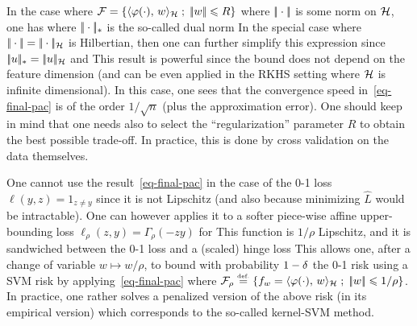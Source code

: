 \begin{exmp}
	In the case where $\mathcal{F} = \left\{  \langle \varphi(\cdot),\,w\rangle_{\mathcal{H}}  \;;\;  |\!| w |\!| \leqslant R \right\}$
	where $|\!| \cdot |\!|$ is some norm on $\mathcal{H}$, one has
	where $|\!| \cdot |\!|_*$ is the so-called dual norm
	In the special case where $|\!| \cdot |\!|=|\!| \cdot |\!|_{\mathcal{H}}$ is Hilbertian, then one can further simplify this expression since
	$|\!| u |\!|_* = |\!| u |\!|_{\mathcal{H}}$ and
	This result is powerful since the bound does not depend on the feature dimension (and can be even applied in the RKHS setting where $\mathcal{H}$ is infinite dimensional).
	In this case, one sees that  the convergence speed in~\eqref{eq-final-pac} is of the order $1/\sqrt{n}$ (plus the approximation error).
	One should keep in mind that one needs also to select the ``regularization'' parameter $R$ to obtain the best possible trade-off. In practice, this is done by cross validation on the data themselves.  
\end{exmp}

\begin{exmp}
	One cannot use the result~\eqref{eq-final-pac} in the case of the 0-1 loss $\ell(y,z)=1_{z \neq y}$ since it is not Lipschitz (and also because minimizing $\hat L$ would be intractable). One can however applies it to a softer piece-wise affine upper-bounding loss $\ell_\rho(z,y)=\Gamma_\rho(-zy)$ for 
	This function is $1/\rho$ Lipschitz, and it is sandwiched between the 0-1 loss and a (scaled) hinge loss 
	This allows one, after a change of variable $w \mapsto w/\rho$, to bound with probability $1-\delta$ the 0-1 risk using a SVM risk by applying~\eqref{eq-final-pac}
	where $\mathcal{F}_\rho \stackrel{\mbox{\upshape\tiny def.}}{=} \left\{  f_w = \langle \varphi(\cdot),\,w\rangle_{\mathcal{H}}  \;;\;  |\!| w |\!| \leqslant 1/\rho \right\}$.
	In practice, one rather solves a penalized version of the above  risk (in its empirical version)
	which corresponds to the so-called kernel-SVM method.
\end{exmp} 

